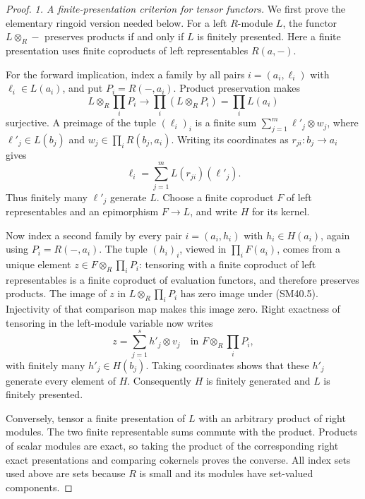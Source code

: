 \begin{proof}
\emph{1. A finite-presentation criterion for tensor functors.}
We first prove the elementary ringoid version needed below.
For a left \(R\)-module \(L\), the functor
\(L\otimes_R-\) preserves products if and only if \(L\)
is finitely presented.  Here a finite presentation uses
finite coproducts of left representables \(R(a,-)\).

For the forward implication, index a family by all pairs
\(i=(a_i,\ell_i)\) with \(\ell_i\in L(a_i)\), and put
\(P_i=R(-,a_i)\).  Product preservation makes
\[
 L\otimes_R\prod_iP_i\longrightarrow
                \prod_i(L\otimes_RP_i)=\prod_iL(a_i)          \tag{SM40.5}
\]
surjective.  A preimage of the tuple \((\ell_i)_i\) is a
finite sum \(\sum_{j=1}^m\ell'_j\otimes w_j\), where
\(\ell'_j\in L(b_j)\) and
\(w_j\in\prod_iR(b_j,a_i)\).  Writing its coordinates
as \(r_{ji}:b_j\to a_i\) gives
\[
                  \ell_i=\sum_{j=1}^m L(r_{ji})(\ell'_j).
\]
Thus finitely many \(\ell'_j\) generate \(L\).  Choose a
finite coproduct \(F\) of left representables and an
epimorphism \(F\to L\), and write \(H\) for its kernel.

Now index a second family by every pair
\(i=(a_i,h_i)\) with \(h_i\in H(a_i)\), again using
\(P_i=R(-,a_i)\).  The tuple \((h_i)_i\), viewed in
\(\prod_i F(a_i)\), comes from a unique element
\(z\in F\otimes_R\prod_iP_i\): tensoring with a finite
coproduct of left representables is a finite coproduct of
evaluation functors, and therefore preserves products.
The image of \(z\) in \(L\otimes_R\prod_iP_i\) has zero
image under (SM40.5).  Injectivity of that comparison map
makes this image zero.  Right exactness of tensoring in
the left-module variable now writes
\[
                  z=\sum_{j=1}^s h'_j\otimes v_j
       \quad\text{in }F\otimes_R\prod_iP_i,
\]
with finitely many \(h'_j\in H(b_j)\).  Taking coordinates
shows that these \(h'_j\) generate every element of \(H\).
Consequently \(H\) is finitely generated and \(L\) is
finitely presented.

Conversely, tensor a finite presentation of \(L\) with
an arbitrary product of right modules.  The two finite
representable sums commute with the product.  Products
of scalar modules are exact, so taking the product of
the corresponding right exact presentations and comparing
cokernels proves the converse.  All index sets used above
are sets because \(R\) is small and its modules have
set-valued components.


\end{proof}
